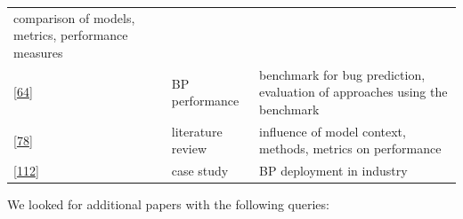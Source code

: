 \documentclass[]{book}
\begin{document}
\begin{longtable}[]{@{}lll@{}}
\begin{minipage}[t]{0.50\columnwidth}
comparison of models, metrics, performance measures\strut
\end{minipage}\tabularnewline
\begin{minipage}[t]{0.23\columnwidth}\raggedright\strut
{[}\protect\hyperlink{ref-DAmbros2010}{64}{]}\strut
\end{minipage} & \begin{minipage}[t]{0.18\columnwidth}\raggedright\strut
BP performance\strut
\end{minipage} & \begin{minipage}[t]{0.50\columnwidth}\raggedright\strut
benchmark for bug prediction, evaluation of approaches using the
benchmark\strut
\end{minipage}\tabularnewline
\begin{minipage}[t]{0.23\columnwidth}\raggedright\strut
{[}\protect\hyperlink{ref-Hall2012}{78}{]}\strut
\end{minipage} & \begin{minipage}[t]{0.18\columnwidth}\raggedright\strut
literature review\strut
\end{minipage} & \begin{minipage}[t]{0.50\columnwidth}\raggedright\strut
influence of model context, methods, metrics on performance\strut
\end{minipage}\tabularnewline
\begin{minipage}[t]{0.23\columnwidth}\raggedright\strut
{[}\protect\hyperlink{ref-Lewis2013}{112}{]}\strut
\end{minipage} & \begin{minipage}[t]{0.18\columnwidth}\raggedright\strut
case study\strut
\end{minipage} & \begin{minipage}[t]{0.50\columnwidth}\raggedright\strut
BP deployment in industry\strut
\end{minipage}\tabularnewline
\bottomrule
\end{longtable}

We looked for additional papers with the following queries:
\end{document}
